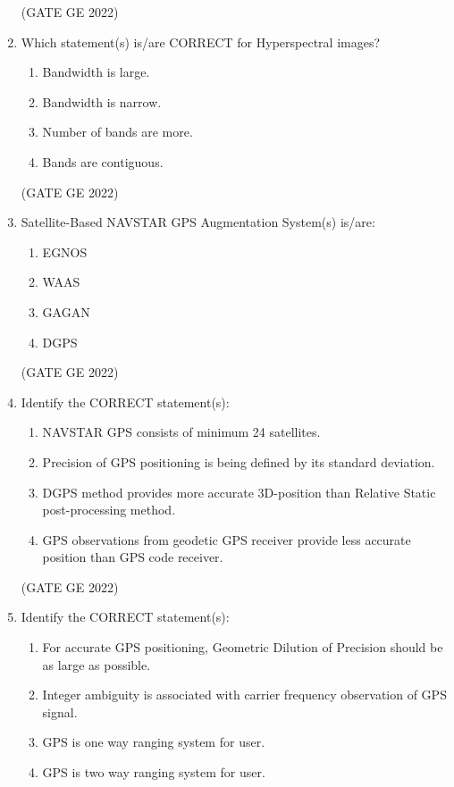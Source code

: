 \documentclass[journal,12pt,onecolumn]{IEEEtran}
\theoremstyle{remark}
\begin{document}
\begin{enumerate}
\hfill (GATE GE 2022)

\item Which statement(s) is/are CORRECT for Hyperspectral images?
\begin{enumerate}
    \item Bandwidth is large.
    \item Bandwidth is narrow.
    \item Number of bands are more.
    \item Bands are contiguous.
\end{enumerate}

\hfill (GATE GE 2022)

\item Satellite-Based NAVSTAR GPS Augmentation System(s) is/are:
\begin{enumerate}
    \item EGNOS
    \item WAAS
    \item GAGAN
    \item DGPS
\end{enumerate}

\hfill (GATE GE 2022)

\item Identify the CORRECT statement(s):
\begin{enumerate}
    \item NAVSTAR GPS consists of minimum 24 satellites.
    \item Precision of GPS positioning is being defined by its standard deviation.
    \item DGPS method provides more accurate 3D-position than Relative Static post-processing method.
    \item GPS observations from geodetic GPS receiver provide less accurate position than GPS code receiver.
\end{enumerate}

\hfill (GATE GE 2022)

\item Identify the CORRECT statement(s):
\begin{enumerate}
    \item For accurate GPS positioning, Geometric Dilution of Precision should be as large as possible.
    \item Integer ambiguity is associated with carrier frequency observation of GPS signal.
    \item GPS is one way ranging system for user.
    \item GPS is two way ranging system for user.
\end{enumerate}


\end{enumerate}
\end{document}
